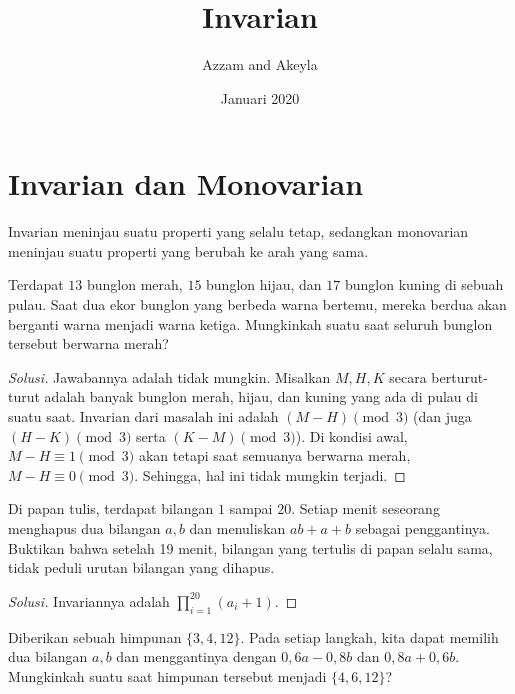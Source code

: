 \documentclass[11pt]{scrartcl}
\title{Invarian}
\author{Azzam and Akeyla}
\date{Januari 2020}
\begin{document}
\maketitle

\renewcommand*\contentsname{Daftar Isi}
\tableofcontents

\newpage

\section{Invarian dan Monovarian}
Invarian meninjau suatu properti yang selalu tetap, sedangkan monovarian meninjau suatu properti yang berubah ke arah yang sama.

\begin{example}
    Terdapat $13$ bunglon merah, $15$ bunglon hijau, dan $17$ bunglon kuning di sebuah pulau. Saat dua ekor bunglon yang berbeda warna bertemu, mereka berdua akan berganti warna menjadi warna ketiga. Mungkinkah suatu saat seluruh bunglon tersebut berwarna merah?
\end{example}

\begin{proof}[Solusi]
    Jawabannya adalah tidak mungkin. Misalkan $M, H, K$ secara berturut-turut adalah banyak bunglon merah, hijau, dan kuning yang ada di pulau di suatu saat. Invarian dari masalah ini adalah $(M - H) \pmod{3}$ (dan juga $(H - K) \pmod{3}$ serta $(K - M) \pmod{3}$). Di kondisi awal, $M - H \equiv 1 \pmod{3}$ akan tetapi saat semuanya berwarna merah, $M - H \equiv 0 \pmod{3}$. Sehingga, hal ini tidak mungkin terjadi.
\end{proof}

\begin{example}
    Di papan tulis, terdapat bilangan $1$ sampai $20$. Setiap menit seseorang menghapus dua bilangan $a,b$ dan menuliskan $ab + a + b$ sebagai penggantinya. Buktikan bahwa setelah 19 menit, bilangan yang tertulis di papan selalu sama, tidak peduli urutan bilangan yang dihapus.
\end{example}

\begin{proof}[Solusi]
    Invariannya adalah $\prod_{i = 1}^{20} (a_i + 1)$.
\end{proof}

\begin{example}
    Diberikan sebuah himpunan $\{3, 4, 12\}$. Pada setiap langkah, kita dapat memilih dua bilangan $a,b$ dan menggantinya dengan $0,6a - 0,8b$ dan $0,8a + 0,6b$. Mungkinkah suatu saat himpunan tersebut menjadi $\{4, 6, 12\}$?
\end{example}
\end{document}
